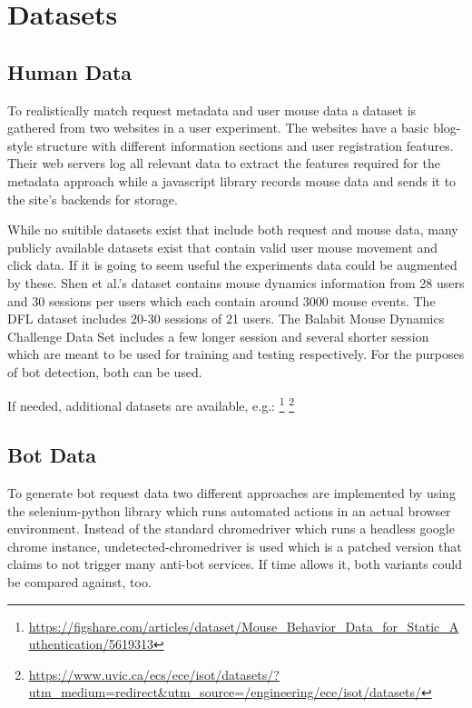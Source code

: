 \documentclass[
    fontsize=12pt,
    headings=small,
    parskip=half,           %
    bibliography=totoc,
    numbers=noenddot,       %
    open=any,               %
    final                   %
    ]{scrreprt}
\begin{document}
\section{Datasets}


\subsection{Human Data}

To realistically match request metadata and user mouse data a dataset is gathered from two websites in a user experiment. The websites have a basic blog-style structure with different information sections and user registration features. Their web servers log all relevant data to extract the features required for the metadata approach while a javascript library records mouse data and sends it to the site's backends for storage.

While no suitible datasets exist that include both request and mouse data, many publicly available datasets exist that contain valid user mouse movement and click data. If it is going to seem useful the experiments data could be augmented by these.
Shen et al.'s \cite{6263955} dataset contains mouse dynamics information from 28 users and 30 sessions per users which each contain around 3000 mouse events.
The DFL dataset \cite{9111596} includes 20-30 sessions of 21 users.
The Balabit Mouse Dynamics Challenge Data Set \cite{BALABIT_CHALLENGE} includes a few longer session and several shorter session which are meant to be used for training and testing respectively. For the purposes of bot detection, both can be used.

If needed, additional datasets are available, e.g.:
\footnote{\url{https://figshare.com/articles/dataset/Mouse_Behavior_Data_for_Static_Authentication/5619313}}
\footnote{\url{https://www.uvic.ca/ecs/ece/isot/datasets/?utm_medium=redirect&utm_source=/engineering/ece/isot/datasets/}}


\subsection{Bot Data}

To generate bot request data two different approaches are implemented by using the selenium-python \cite{SELENIUMPYTHON} library which runs automated actions in an actual browser environment. Instead of the standard chromedriver which runs a headless google chrome instance, undetected-chromedriver \cite{UNDETECTEDCHROMEDRIVER} is used which is a patched version that claims to not trigger many anti-bot services. If time allows it, both variants could be compared against, too.
\end{document}
